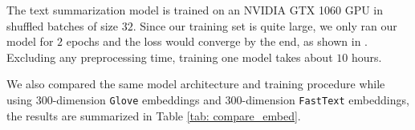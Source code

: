 The text summarization model is trained on an NVIDIA GTX 1060 GPU in shuffled batches of size $32$. Since our training set is quite large, we only ran our model for $2$ epochs and the loss would converge by the end, as shown in . Excluding any preprocessing time, training one model takes about $10$ hours.

We also compared the same model architecture and training procedure while using $300$-dimension \texttt{Glove} embeddings and $300$-dimension \texttt{FastText} embeddings, the results are summarized in Table \ref{tab: compare_embed}.



